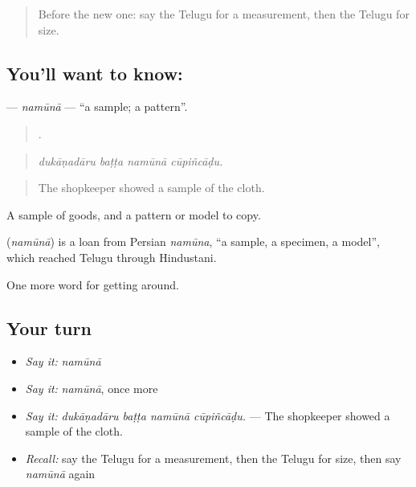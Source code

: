 \label{lesson:TE-C486-namuna}



\begin{quote}
Before the new one: say the Telugu for a measurement, then the Telugu for size.
\end{quote}

\subsection*{You'll want to know: }
\textbf{} — \emph{namūnā} — \textquotedblleft{}a sample; a pattern\textquotedblright{}.

\begin{quote}
   .
\end{quote}

\begin{quote}
\emph{dukāṇadāru baṭṭa namūnā cūpiñcāḍu.}
\end{quote}

\begin{quote}
The shopkeeper showed a sample of the cloth.
\end{quote}

A sample of goods, and a pattern or model to copy.

\begin{cousinweb}
\textbf{} (\emph{namūnā}) is a loan from Persian \emph{namūna}, \textquotedblleft{}a sample, a specimen, a model\textquotedblright{}, which reached Telugu through Hindustani.
\end{cousinweb}

\begin{grammarlens}[title={What you've built}]
One more word for getting around.
\end{grammarlens}

\subsection*{Your turn}
\begin{itemize}
\raggedright
  \item \emph{Say it:} \emph{namūnā}
  \item \emph{Say it:} \emph{namūnā}, once more
  \item \emph{Say it:} \emph{dukāṇadāru baṭṭa namūnā cūpiñcāḍu.} — The shopkeeper showed a sample of the cloth.
  \item \emph{Recall:} say the Telugu for a measurement, then the Telugu for size, then say \emph{namūnā} again
\end{itemize}

